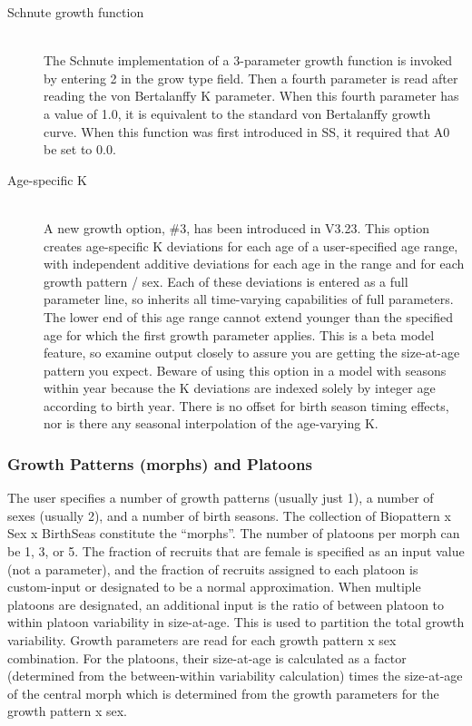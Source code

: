 \begin{description}
	\item[Schnute growth function]\hfil\\
	The Schnute implementation of a 3-parameter growth function is invoked by entering 2 in the grow type field.  Then a fourth parameter is read after reading the von Bertalanffy K parameter.  When this fourth parameter has a value of 1.0, it is equivalent to the standard von Bertalanffy growth curve.  When this function was first introduced in SS, it required that A0 be set to 0.0.
	\item[Age-specific K]\hfil\\
	A new growth option, \#3, has been introduced in V3.23.  This option creates age-specific K deviations for each age of a user-specified age range, with independent additive deviations for each age in the range and for each growth pattern / sex.  Each of these deviations is entered as a full parameter line, so inherits all time-varying capabilities of full parameters.  The lower end of this age range cannot extend younger than the specified age for which the first growth parameter applies.  This is a beta model feature, so examine output closely to assure you are getting the size-at-age pattern you expect.  Beware of using this option in a model with seasons within year because the K deviations are indexed solely by integer age according to birth year.  There is no offset for birth season timing effects, nor is there any seasonal interpolation of the age-varying K.
\end{description}

\subsubsection{Growth Patterns (morphs) and Platoons}
The user specifies a number of growth patterns (usually just 1), a number of sexes (usually 2), and a number of birth seasons.  The collection of Bio\textunderscore pattern x Sex x BirthSeas constitute the “morphs”.  The number of platoons per morph can be 1, 3, or 5.  The fraction of recruits that are female is specified as an input value (not a parameter), and the fraction of recruits assigned to each platoon is custom-input or designated to be a normal approximation.  When multiple platoons are designated, an additional input is the ratio of between platoon to within platoon variability in size-at-age.  This is used to partition the total growth variability.  Growth parameters are read for each growth pattern x sex combination.  For the platoons, their size-at-age is calculated as a factor (determined from the between-within variability calculation) times the size-at-age of the central morph which is determined from the growth parameters for the growth pattern x sex.

